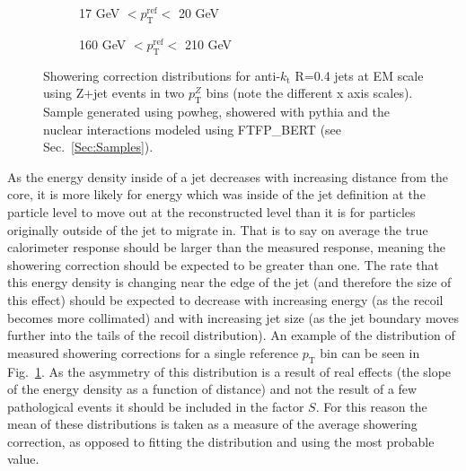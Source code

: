 \begin{figure}[!ht]
  \centering
  \begin{subfigure}{.5\textwidth}
    \centering
    \caption{17 GeV $< p_{\mathrm{T}}^{\mathrm{ref}} < $ 20 GeV}
  \end{subfigure}%
  \begin{subfigure}{.5\textwidth}  \centering
    \caption{160 GeV $< p_{\mathrm{T}}^{\mathrm{ref}} < $ 210 GeV}
  \end{subfigure}
 \caption[Example showering correction distributions]
 {\small Showering correction distributions for anti-$k_{\mathrm t}$ R=0.4 jets at EM scale using Z+jet events in two $p_{\mathrm T}^Z$ bins (note the different x axis scales).  Sample generated using {\sc powheg}, showered with {\sc pythia} and the nuclear interactions modeled using FTFP\_BERT (see Sec.~\ref{Sec:Samples}).   }
 \label{Fig:ShoweringDistExample}
\end{figure}

As the energy density inside of a jet decreases with increasing distance from the core, it is more likely for energy which was inside of the jet definition at the particle level to move out at the reconstructed level than it is for particles originally outside of the jet to migrate in.  
That is to say on average the true calorimeter response should be larger than the measured response, meaning the showering correction should be expected to be greater than one.  
The rate that this energy density is changing near the edge of the jet (and therefore the size of this effect) should be expected to decrease with increasing energy (as the recoil becomes more collimated) and with increasing jet size (as the jet boundary moves further into the tails of the recoil distribution).  
An example of the distribution of measured showering corrections for a single reference $p_{\mathrm T}$ bin can be seen in Fig.~\ref{Fig:ShoweringDistExample}.  
As the asymmetry of this distribution is a result of real effects (the slope of the energy density as a function of distance) and not the result of a few pathological events it should be included in the factor $S$.  
For this reason the mean of these distributions is taken as a measure of the average showering correction, as opposed to fitting the distribution and using the most probable value.  

